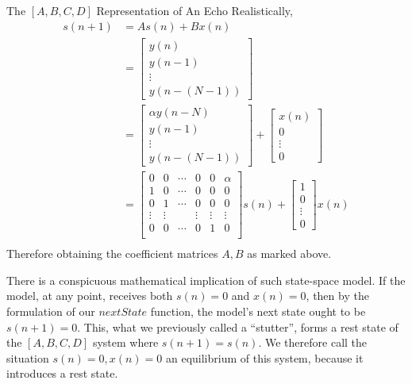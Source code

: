 \begin{ln-example}{The $[A, B, C, D]$ Representation of An Echo}{}
    Realistically,
    \begin{align*}
        s(n + 1) &= A s(n) + B x(n) \\
        &= \begin{bmatrix} y(n) \\ y(n - 1) \\ \vdots \\ y(n - (N - 1)) \end{bmatrix} \\
        &= \begin{bmatrix} \alpha y(n - N) \\ y(n - 1) \\ \vdots \\ y(n - (N - 1)) \end{bmatrix} + \begin{bmatrix} x(n) \\ 0 \\ \vdots \\ 0 \end{bmatrix} \\
        &= \begin{bmatrix}
            0 & 0 & \cdots & 0 & 0 & \alpha \\
            1 & 0 & \cdots & 0 & 0 & 0 \\
            0 & 1 & \cdots & 0 & 0 & 0 \\
            \vdots & \vdots &  & \vdots & \vdots & \vdots \\
            0 & 0 & \cdots & 0 & 1 & 0 \\
        \end{bmatrix} s(n) + \begin{bmatrix} 1 \\ 0 \\ \vdots \\ 0 \end{bmatrix} x(n) \\
    \end{align*}
    Therefore obtaining the coefficient matrices $A, B$ as marked above.
\end{ln-example}

There is a conspicuous mathematical implication of such state-space model.
If the model, at any point, receives both $s(n) = 0$ and $x(n) = 0$, then by the formulation of our $nextState$ function, the model's next state ought to be $s(n + 1) = 0$.
This, what we previously called a ``stutter'', forms a rest state of the $[A, B, C, D]$ system where $s(n+1) = s(n)$. We therefore call the situation $s(n) = 0, x(n) = 0$ an equilibrium of this system, because it introduces a rest state.

